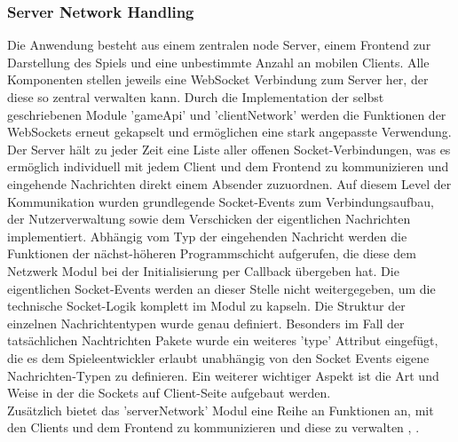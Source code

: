\documentclass[a4paper]{spie}  %
\begin{document}
\subsubsection{Server Network Handling}
Die Anwendung besteht aus einem zentralen node Server, einem Frontend zur Darstellung des Spiels und eine unbestimmte Anzahl an mobilen Clients. Alle Komponenten stellen jeweils eine WebSocket Verbindung zum Server her, der diese so zentral verwalten kann. Durch die Implementation der selbst geschriebenen Module 'gameApi' und 'clientNetwork' werden die Funktionen der WebSockets erneut gekapselt und ermöglichen eine stark angepasste Verwendung.\\
Der Server hält zu jeder Zeit eine Liste aller offenen Socket-Verbindungen, was es ermöglich individuell mit jedem Client und dem Frontend zu kommunizieren und eingehende Nachrichten direkt einem Absender zuzuordnen. Auf diesem Level der Kommunikation wurden grundlegende Socket-Events zum Verbindungsaufbau, der Nutzerverwaltung sowie dem Verschicken der eigentlichen Nachrichten implementiert. Abhängig vom Typ der eingehenden Nachricht werden die Funktionen der nächst-höheren Programmschicht aufgerufen, die diese dem Netzwerk Modul bei der Initialisierung per Callback übergeben hat. Die eigentlichen Socket-Events werden an dieser Stelle nicht weitergegeben, um die technische Socket-Logik komplett im Modul zu kapseln. Die Struktur der einzelnen Nachrichtentypen wurde genau definiert. Besonders im Fall der tatsächlichen Nachtrichten Pakete wurde ein weiteres 'type' Attribut eingefügt, die es dem Spieleentwickler erlaubt unabhängig von den Socket Events eigene Nachrichten-Typen zu definieren. Ein weiterer wichtiger Aspekt ist die Art und Weise in der die Sockets auf Client-Seite aufgebaut werden.\\
Zusätzlich bietet das 'serverNetwork' Modul eine Reihe an Funktionen an, mit den Clients und dem Frontend zu kommunizieren und diese zu verwalten \cite{js-object2pages},\cite{js-persistencewebsockets} .
\end{document}
